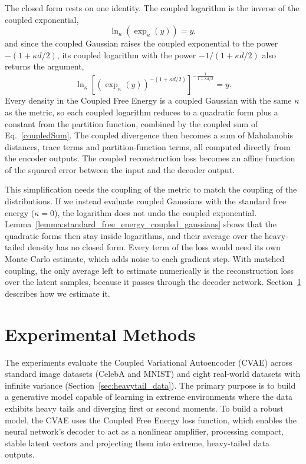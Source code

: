 \documentclass[twoside,11pt]{article}
\begin{document}
The closed form rests on one identity. The coupled logarithm is the inverse of the coupled exponential,
\begin{equation}
\ln_{\kappa}\left(\exp_\kappa(y)\right)=y,
\end{equation}
and since the coupled Gaussian raises the coupled exponential to the power $-(1+\kappa d/2)$, its coupled logarithm with the power $-1/(1+\kappa d/2)$ also returns the argument,
\begin{equation}
\ln_{\kappa}
\left[
\left(
\exp_\kappa(y)
\right)^{-(1+\kappa d/2)}
\right]^{-\frac{1}{1+\kappa d/2}}
=
y.
\end{equation}
Every density in the Coupled Free Energy is a coupled Gaussian with the same $\kappa$ as the metric, so each coupled logarithm reduces to a quadratic form plus a constant from the partition function, combined by the coupled sum of Eq.~\ref{coupledSum}. The coupled divergence then becomes a sum of Mahalanobis distances, trace terms and partition-function terms, all computed directly from the encoder outputs. The coupled reconstruction loss becomes an affine function of the squared error between the input and the decoder output.

This simplification needs the coupling of the metric to match the coupling of the distributions. If we instead evaluate coupled Gaussians with the standard free energy ($\kappa = 0$), the logarithm does not undo the coupled exponential. Lemma~\ref{lemma:standard_free_energy_coupled_gaussians} shows that the quadratic forms then stay inside logarithms, and their average over the heavy-tailed density has no closed form. Every term of the loss would need its own Monte Carlo estimate, which adds noise to each gradient step. With matched coupling, the only average left to estimate numerically is the reconstruction loss over the latent samples, because it passes through the decoder network. Section~\ref{sec:methods} describes how we estimate it.

\section{Experimental Methods} \label{sec:methods}

The experiments evaluate the Coupled Variational Autoencoder (CVAE) across standard image datasets (CelebA and MNIST) and eight real-world datasets with infinite variance (Section~\ref{sec:heavytail_data}). The primary purpose is to build a generative model capable of learning in extreme environments where the data exhibits heavy tails and diverging first or second moments. To build a robust model, the CVAE uses the Coupled Free Energy loss function, which enables the neural network's decoder to act as a nonlinear amplifier, processing compact, stable latent vectors and projecting them into extreme, heavy-tailed data outputs.
\end{document}
